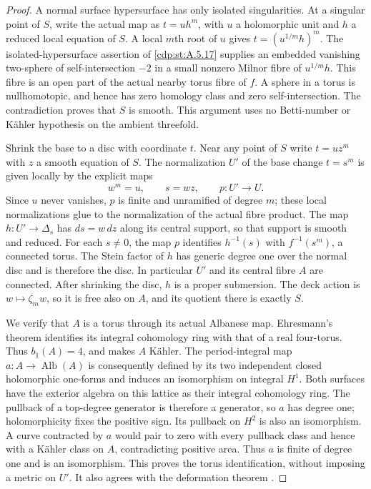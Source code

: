 \begin{proof}
A normal surface hypersurface has only isolated
singularities. At a singular point of $S$, write the
actual map as $t=u h^m$, with $u$ a holomorphic unit
and $h$ a reduced local equation of $S$. A local
$m$th root of $u$ gives $t=(u^{1/m}h)^m$. The
isolated-hypersurface assertion of \ref{cdp:st:A.5.17} supplies an
embedded vanishing two-sphere of self-intersection
$-2$ in a small nonzero Milnor fibre of $u^{1/m}h$.
This fibre is an open part of the actual nearby
torus fibre of $f$. A sphere in a torus is nullhomotopic,
and hence has zero homology class and zero
self-intersection. The contradiction proves that $S$
is smooth. This argument uses no Betti-number or
K\"ahler hypothesis on the ambient threefold.

Shrink the base to a disc with coordinate $t$. Near
any point of $S$ write $t=u z^m$ with $z$ a smooth
equation of $S$. The normalization $U'$ of the base
change $t=s^m$ is given locally by the explicit maps
\[
        w^m=u,\qquad s=wz,
        \qquad p:U'\longrightarrow U.
 \tag{C.UNN.1}\label{cdp:eq:C.UNN.1}
\]
Since $u$ never vanishes, $p$ is finite and unramified
of degree $m$; these local normalizations glue to the
normalization of the actual fibre product. The map
$h:U'\to\Delta_s$ has $ds=w\,dz$ along its central
support, so that support is smooth and reduced.
For each $s\ne0$, the map $p$ identifies $h^{-1}(s)$
with $f^{-1}(s^m)$, a connected torus. The Stein
factor of $h$ has generic degree one over the normal
disc and is therefore the disc. In particular $U'$
and its central fibre $A$ are connected. After
shrinking the disc, $h$ is a proper submersion.
The deck action is $w\mapsto\zeta_m w$, so it is
free also on $A$, and its quotient there is exactly
$S$.

We verify that $A$ is a torus through its actual
Albanese map. Ehresmann's theorem identifies its
integral cohomology ring with that of a real
four-torus. Thus $b_1(A)=4$, and
\cite[Theorem~11]{Buchdahl1999} makes $A$ K\"ahler.
The period-integral map
$a:A\to\operatorname{Alb}(A)$ is consequently
defined by its two independent closed holomorphic
one-forms and induces an isomorphism on integral
$H^1$. Both surfaces have the exterior algebra on
this lattice as their integral cohomology ring.
The pullback of a top-degree generator is therefore
a generator, so $a$ has degree one; holomorphicity
fixes the positive sign. Its pullback on $H^2$ is
also an isomorphism. A curve contracted by $a$
would pair to zero with every pullback class and
hence with a K\"ahler class on $A$, contradicting
positive area. Thus $a$ is finite of degree one
and is an isomorphism. This proves the torus
identification, without imposing a metric on $U'$.
It also agrees with the deformation theorem
\cite[Theorem~4.6]{Catanese2002}.


\end{proof}
